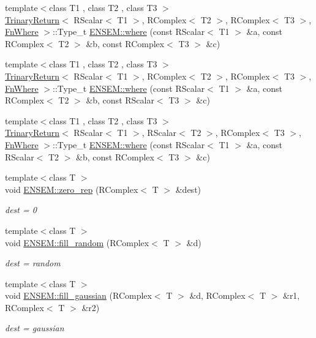 \begin{DoxyCompactItemize}
\item 
{\footnotesize template$<$class T1 , class T2 , class T3 $>$ }\\\mbox{\hyperlink{structTrinaryReturn}{Trinary\+Return}}$<$ R\+Scalar$<$ T1 $>$, R\+Complex$<$ T2 $>$, R\+Complex$<$ T3 $>$, \mbox{\hyperlink{structFnWhere}{Fn\+Where}} $>$\+::Type\+\_\+t \mbox{\hyperlink{group__rcomplex_ga1cdf9105d38ae9d995cba5874914982d}{E\+N\+S\+E\+M\+::where}} (const R\+Scalar$<$ T1 $>$ \&a, const R\+Complex$<$ T2 $>$ \&b, const R\+Complex$<$ T3 $>$ \&c)
\item 
{\footnotesize template$<$class T1 , class T2 , class T3 $>$ }\\\mbox{\hyperlink{structTrinaryReturn}{Trinary\+Return}}$<$ R\+Scalar$<$ T1 $>$, R\+Complex$<$ T2 $>$, R\+Complex$<$ T3 $>$, \mbox{\hyperlink{structFnWhere}{Fn\+Where}} $>$\+::Type\+\_\+t \mbox{\hyperlink{group__rcomplex_gadf07511990ea74c6e0d3b72f19e880f3}{E\+N\+S\+E\+M\+::where}} (const R\+Scalar$<$ T1 $>$ \&a, const R\+Complex$<$ T2 $>$ \&b, const R\+Scalar$<$ T3 $>$ \&c)
\item 
{\footnotesize template$<$class T1 , class T2 , class T3 $>$ }\\\mbox{\hyperlink{structTrinaryReturn}{Trinary\+Return}}$<$ R\+Scalar$<$ T1 $>$, R\+Scalar$<$ T2 $>$, R\+Complex$<$ T3 $>$, \mbox{\hyperlink{structFnWhere}{Fn\+Where}} $>$\+::Type\+\_\+t \mbox{\hyperlink{group__rcomplex_ga69c3ed4f12ac9e2b1fcba29be62f0622}{E\+N\+S\+E\+M\+::where}} (const R\+Scalar$<$ T1 $>$ \&a, const R\+Scalar$<$ T2 $>$ \&b, const R\+Complex$<$ T3 $>$ \&c)
\item 
{\footnotesize template$<$class T $>$ }\\void \mbox{\hyperlink{group__rcomplex_gaf64745e6e9f179738a187230acf6b2ea}{E\+N\+S\+E\+M\+::zero\+\_\+rep}} (R\+Complex$<$ T $>$ \&dest)
\begin{DoxyCompactList}\small\item\em dest = 0 \end{DoxyCompactList}\item 
{\footnotesize template$<$class T $>$ }\\void \mbox{\hyperlink{group__rcomplex_ga376839cc33ca36a705bdb22f74bb22d4}{E\+N\+S\+E\+M\+::fill\+\_\+random}} (R\+Complex$<$ T $>$ \&d)
\begin{DoxyCompactList}\small\item\em dest = random \end{DoxyCompactList}\item 
{\footnotesize template$<$class T $>$ }\\void \mbox{\hyperlink{group__rcomplex_gaa47b1150a227265f108216052a5029d8}{E\+N\+S\+E\+M\+::fill\+\_\+gaussian}} (R\+Complex$<$ T $>$ \&d, R\+Complex$<$ T $>$ \&r1, R\+Complex$<$ T $>$ \&r2)
\begin{DoxyCompactList}\small\item\em dest = gaussian \end{DoxyCompactList}\end{DoxyCompactItemize}
